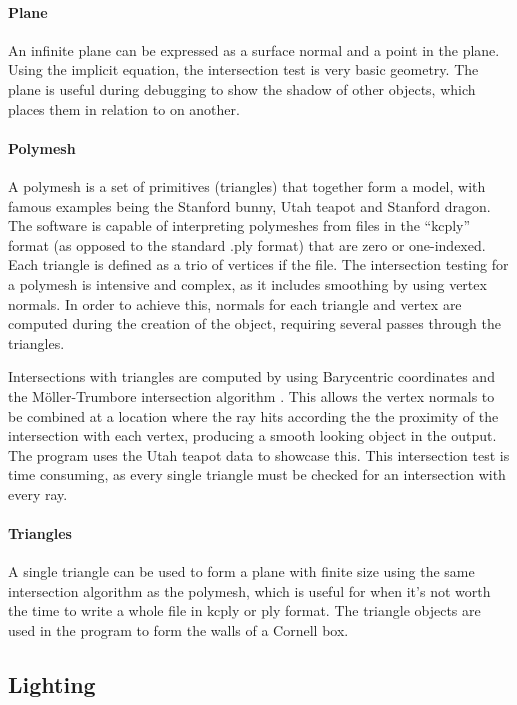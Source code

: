 \documentclass[a4paper]{article}
\begin{document}
\paragraph{Plane} An infinite plane can be expressed as a surface normal and a point in the plane. Using the implicit equation, the intersection test is very basic geometry. The plane is useful during debugging to show the shadow of other objects, which places them in relation to on another.

\paragraph{Polymesh} A polymesh is a set of primitives (triangles) that together form a model, with famous examples being the Stanford bunny, Utah teapot and Stanford dragon. The software is capable of interpreting polymeshes from files in the ``kcply'' format (as opposed to the standard .ply format) that are zero or one-indexed. Each triangle is defined as a trio of vertices if the file. The intersection testing for a polymesh is intensive and complex, as it includes smoothing by using vertex normals. In order to achieve this, normals for each triangle and vertex are computed during the creation of the object, requiring several passes through the triangles.

Intersections with triangles are computed by using Barycentric coordinates and the M{\"o}ller-Trumbore intersection algorithm \cite{}. This allows the vertex normals to be combined at a location where the ray hits according the the proximity of the intersection with each vertex, producing a smooth looking object in the output. The program uses the Utah teapot data to showcase this. This intersection test is time consuming, as every single triangle must be checked for an intersection with every ray.

\paragraph{Triangles} A single triangle can be used to form a plane with finite size using the same intersection algorithm as the polymesh, which is useful for when it's not worth the time to write a whole file in kcply or ply format. The triangle objects are used in the program to form the walls of a Cornell box.

\subsection{Lighting}
\end{document}
